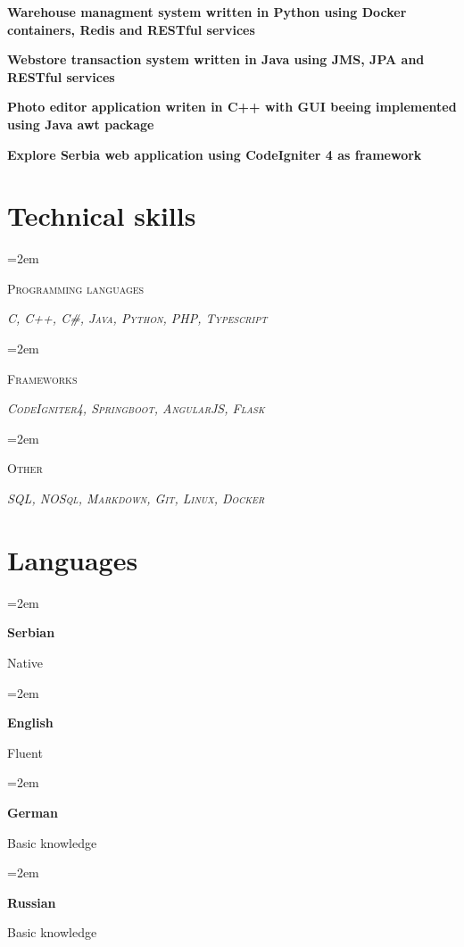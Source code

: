 \documentclass[12pt]{article}
\newlength{\spacebox}
\newcommand{\sepspace}{\vspace*{1em}}
\newcommand{\skill}[2]{
  \noindent\hangindent=2em\hangafter=0
  \parbox{3\spacebox}{%
    \textsc{#1}} %
  \textsl{#2} \par} %
\newcommand{\lan}[2]{
    \noindent\hangindent=2em\hangafter=0
    \parbox{\spacebox}{%
        \textbf{#1}} %
     #2 \par}    %
\newcommand{\project}[1]{

  \noindent  \textbf{#1}
  
\normalsize \par}
\begin{document}
\project{Warehouse managment system written in Python using Docker containers, Redis and RESTful services}

\project{Webstore transaction system written in Java using JMS, JPA and RESTful services}

\project{Photo editor application writen in C++ with GUI beeing implemented using Java awt package}

\project{Explore Serbia web application using CodeIgniter 4 as framework}


\sepspace

\section*{Technical skills}

\skill{Programming languages}{
  \textsc{C}, \textsc{C++}, \textsc{C\#}, \textsc{Java}, \textsc{Python}, \textsc{PHP}, \textsc{Typescript}}
\skill{Frameworks}{
  \textsc{CodeIgniter4}, \textsc{Springboot}, \textsc{AngularJS}, \textsc{Flask}}
\skill{Other}{
  \textsc{SQL, NOSql, Markdown, Git, Linux, Docker}}

\section*{Languages}
\lan{Serbian}{Native}
\lan{English}{Fluent}
\lan{German}{Basic knowledge}
\lan{Russian}{Basic knowledge}
\end{document}
